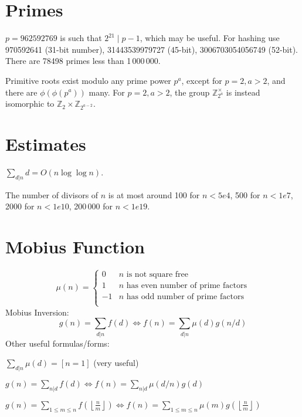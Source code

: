 \section{Primes}
$p=962592769$ is such that $2^{21} \mid p-1$, which may be useful. For hashing
use 970592641 (31-bit number), 31443539979727 (45-bit), 3006703054056749
(52-bit). There are 78498 primes less than 1\,000\,000.

Primitive roots exist modulo any prime power $p^a$, except for $p = 2, a > 2$,
and there are $\phi(\phi(p^a))$ many. For $p = 2, a > 2$, the group $\mathbb
   Z_{2^a}^\times$ is instead isomorphic to $\mathbb Z_2 \times \mathbb
   Z_{2^{a-2}}$.

\section{Estimates}
$\sum_{d|n} d = O(n \log \log n)$.

The number of divisors of $n$ is at most around 100 for $n < 5e4$, 500 for $n <
   1e7$, 2000 for $n < 1e10$, 200\,000 for $n < 1e19$.

\section{Mobius Function}
\[
   \mu(n) = \begin{cases} 0 & n \textrm{ is not square free}\\ 1 & n \textrm{ has even number of prime factors}\\ -1 & n \textrm{ has odd number of prime factors}\\\end{cases}
\]
Mobius Inversion:
\[ g(n) = \sum_{d|n} f(d) \Leftrightarrow f(n) = \sum_{d|n} \mu(d)g(n/d) \]
Other useful formulas/forms:

$ \sum_{d | n} \mu(d) = [ n = 1] $ (very useful)

$ g(n) = \sum_{n|d} f(d) \Leftrightarrow f(n) = \sum_{n|d} \mu(d/n)g(d)$

$ g(n) = \sum_{1 \leq m \leq n} f(\left\lfloor\frac{n}{m}\right \rfloor ) \Leftrightarrow f(n) = \sum_{1\leq m\leq n} \mu(m)g(\left\lfloor\frac{n}{m}\right\rfloor)$

